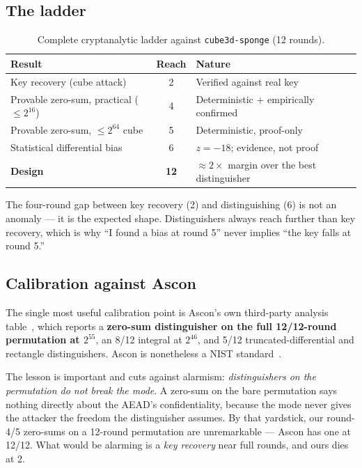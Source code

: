 \documentclass[11pt,a4paper]{article}
\theoremstyle{plain}
\theoremstyle{definition}
\theoremstyle{remark}
\begin{document}
\subsection{The ladder}

\begin{table}[h]
\centering
\caption{Complete cryptanalytic ladder against \texttt{cube3d-sponge} (12 rounds).}
\begin{tabular}{lcl}
\toprule
Result & Reach & Nature \\
\midrule
Key recovery (cube attack)              & 2 & Verified against real key \\
Provable zero-sum, practical ($\le 2^{16}$) & 4 & Deterministic + empirically confirmed \\
Provable zero-sum, $\le 2^{64}$ cube    & 5 & Deterministic, proof-only \\
Statistical differential bias           & 6 & $z = -18$; evidence, not proof \\
\midrule
\textbf{Design}                         & \textbf{12} & $\approx 2\times$ margin over the best distinguisher \\
\bottomrule
\end{tabular}
\end{table}

The four-round gap between key recovery (2) and distinguishing (6) is not an anomaly
--- it is the expected shape. Distinguishers always reach further than key recovery,
which is why ``I found a bias at round 5'' never implies ``the key falls at round 5.''

\subsection{Calibration against Ascon}

The single most useful calibration point is Ascon's own third-party analysis
table~\cite{asconupdate}, which reports a \textbf{zero-sum distinguisher on the full
12/12-round permutation at $2^{55}$}, an 8/12 integral at $2^{46}$, and 5/12
truncated-differential and rectangle distinguishers. Ascon is nonetheless a NIST
standard~\cite{sp800232}.

The lesson is important and cuts against alarmism: \emph{distinguishers on the
permutation do not break the mode}. A zero-sum on the bare permutation says nothing
directly about the AEAD's confidentiality, because the mode never gives the attacker
the freedom the distinguisher assumes. By that yardstick, our round-4/5 zero-sums on a
12-round permutation are unremarkable --- Ascon has one at 12/12. What would be
alarming is a \emph{key recovery} near full rounds, and ours dies at 2.
\end{document}
